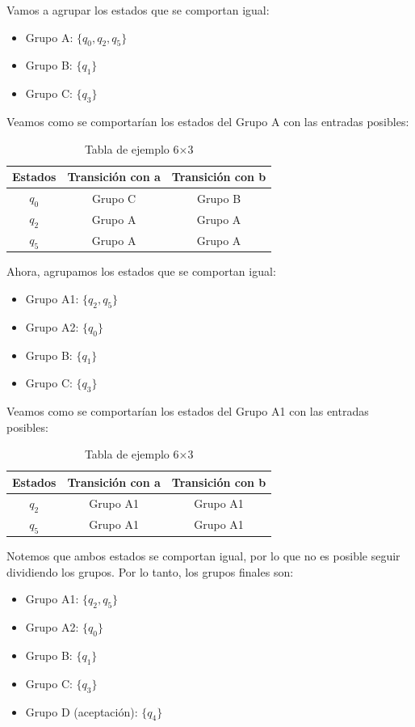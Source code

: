  Vamos a agrupar los estados que se comportan igual:
 \begin{itemize}
    \item Grupo A: $\{q_0, q_2, q_5\}$
    \item Grupo B: $\{q_1\}$
    \item Grupo C: $\{q_3\}$
 \end{itemize}
    Veamos como se comportarían los estados del Grupo A con las entradas posibles:      
    \begin{table}[ht]
    \centering      
    \begin{tabular}{|c|c|c|}
    \hline
    \textbf{Estados} & \textbf{Transición con a} & \textbf{Transición con b } \\
    \hline
    $q_0$ & Grupo C & Grupo B\\     
    \hline
    $q_2$  & Grupo A & Grupo A \\       
    \hline
    $q_5$ & Grupo A & Grupo A \\    
    \hline
    \end{tabular}       
    \caption{Tabla de ejemplo 6×3}
    \label{tab:ejemplo}
    \end{table} 
    Ahora, agrupamos los estados que se comportan igual:
    \begin{itemize}     
        \item Grupo A1: $\{q_2, q_5\}$
        \item Grupo A2: $\{q_0\}$
        \item Grupo B: $\{q_1\}$
        \item Grupo C: $\{q_3\}$
    \end{itemize}
    Veamos como se comportarían los estados del Grupo A1 con las entradas posibles:      
    \begin{table}[ht]        
    \centering      
    \begin{tabular}{|c|c|c|}        
    \hline
    \textbf{Estados} & \textbf{Transición con a} & \textbf{Transición con b } \\
    \hline
    $q_2$  & Grupo A1 & Grupo A1 \\ 
    \hline
    $q_5$ & Grupo A1 & Grupo A1 \\  
    \hline
    \end{tabular}       
    \caption{Tabla de ejemplo 6×3}
    \label{tab:ejemplo} 
    \end{table}
    Notemos que ambos estados se comportan igual, por lo que no es posible seguir dividiendo los grupos. Por lo tanto, los grupos finales son:
    \begin{itemize} 
        \item Grupo A1: $\{q_2, q_5\}$
        \item Grupo A2: $\{q_0\}$
        \item Grupo B: $\{q_1\}$
        \item Grupo C: $\{q_3\}$
        \item Grupo D (aceptación): $\{q_4\}$   
    \end{itemize}
